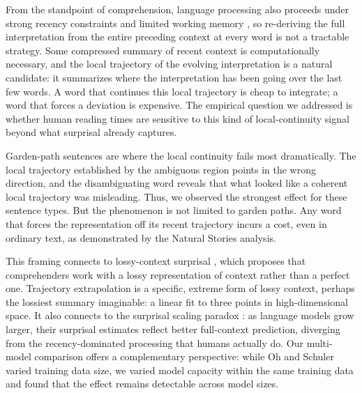 \documentclass[12pt]{article}
\begin{document}
From the standpoint of comprehension, language processing also proceeds under strong recency constraints and limited working memory \citep{gibson1998,lewis2005}, so re-deriving the full interpretation from the entire preceding context at every word is not a tractable strategy. Some compressed summary of recent context is computationally necessary, and the local trajectory of the evolving interpretation is a natural candidate: it summarizes where the interpretation has been going over the last few words. A word that continues this local trajectory is cheap to integrate; a word that forces a deviation is expensive. The empirical question we addressed is whether human reading times are sensitive to this kind of local-continuity signal beyond what surprisal already captures.

Garden-path sentences are where the local continuity fails most dramatically. The local trajectory established by the ambiguous region points in the wrong direction, and the disambiguating word reveals that what looked like a coherent local trajectory was misleading. Thus, we observed the strongest effect for these sentence types. But the phenomenon is not limited to garden paths. Any word that forces the representation off its recent trajectory incurs a cost, even in ordinary text, as demonstrated by the Natural Stories analysis.

This framing connects to lossy-context surprisal \citep{futrell2020}, which proposes that comprehenders work with a lossy representation of context rather than a perfect one. Trajectory extrapolation is a specific, extreme form of lossy context, perhaps the lossiest summary imaginable: a linear fit to three points in high-dimensional space. It also connects to the surprisal scaling paradox \citep{oh2023b}: as language models grow larger, their surprisal estimates reflect better full-context prediction, diverging from the recency-dominated processing that humans actually do. Our multi-model comparison offers a complementary perspective: while Oh and Schuler varied training data size, we varied model capacity within the same training data and found that the effect remains detectable across model sizes.
\end{document}

